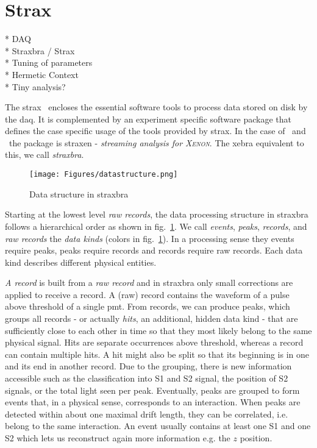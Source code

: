 \newpage
\FloatBarrier
\section{Strax}
\label{sec:Strax}
\FloatBarrier

* DAQ \\
* Straxbra / Strax \\
* Tuning of parameters \\
* Hermetic Context \\
* Tiny analysis?



The \gls{strax}~\cite{strax} encloses the essential software tools to process data stored on disk by the \gls{daq}.  %
It is complemented by an experiment specific software package that defines the case specific usage of the tools provided by strax.
In the case of \oneton~and \nton~the package is straxen - \emph{streaming analysis for \textsc{Xenon}}.  %
The \gls{xebra} equivalent to this, we call \emph{straxbra}.  %

\begin{figure}
\centering
\texttt{[image: Figures/datastructure.png]}  %
\caption[Data structure in straxbra]{
    Data structure in straxbra
    }
\label{fig:data-structure}
\end{figure}


Starting at the lowest level \emph{raw records}, the data processing structure in straxbra follows a hierarchical order as shown in fig.~\ref{fig:data-structure}.
We call \emph{events}, \emph{peaks}, \emph{records}, and \emph{raw records} the \emph{data kinds} (colors in fig.~\ref{fig:data-structure}).
In a processing sense they events require peaks, peaks require records and records require raw records.
Each data kind describes different physical entities.

\emph{A record} is built from a \emph{raw record} and in straxbra only small corrections are applied to receive a record.
A (raw) record contains the waveform of a pulse above threshold of a single \gls{pmt}.
From records, we can produce peaks, which groups all records - or actually \emph{hits}, an additional, hidden data kind - that are sufficiently close to each other in time so that they most likely belong to the same physical signal.
Hits are separate occurrences above threshold, whereas a record can contain multiple hits.
A hit might also  be split so that its beginning is in one and its end in another record.
Due to the grouping, there is new information accessible such as the classification into S1 and S2 signal, the position of S2 signals, or the total light seen per peak.
Eventually, peaks are grouped to form events that, in a physical sense, corresponds to an interaction.
When peaks are detected within about one maximal drift length, they can be correlated, i.e. belong to the same interaction.
An event usually contains at least one S1 and one S2 which lets us reconstruct again more information e.g. the $ z $ position.

